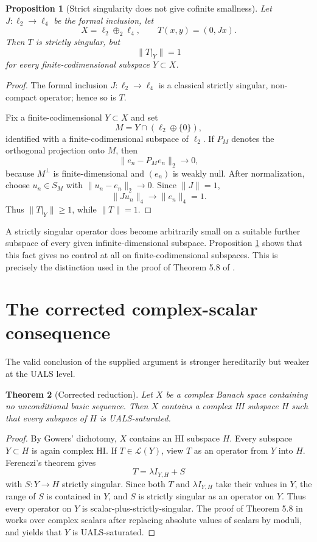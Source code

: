 \documentclass[11pt]{article}
\newtheorem{theorem}{Theorem}[section]
\newtheorem{proposition}[theorem]{Proposition}
\theoremstyle{definition}
\theoremstyle{remark}
\newcommand{\LL}{\mathcal{L}}
\begin{document}
\begin{proposition}[Strict singularity does not give cofinite smallness]\label{prop:J}
Let $J:\ell_2\to\ell_4$ be the formal inclusion, let
\[
  X=\ell_2\oplus_2\ell_4,
  \qquad
  T(x,y)=(0,Jx).
\]
Then $T$ is strictly singular, but
\[
  \|T|_Y\|=1
\]
for every finite-codimensional subspace $Y\subset X$.
\end{proposition}

\begin{proof}
The formal inclusion $J:\ell_2\to\ell_4$ is a classical strictly singular, non-compact operator; hence so is $T$.

Fix a finite-codimensional $Y\subset X$ and set
\[
  M=Y\cap(\ell_2\oplus\{0\}),
\]
identified with a finite-codimensional subspace of $\ell_2$.  If $P_M$ denotes the orthogonal projection onto $M$, then
\[
  \|e_n-P_Me_n\|_2\longrightarrow 0,
\]
because $M^\perp$ is finite-dimensional and $(e_n)$ is weakly null.  After normalization, choose $u_n\in S_M$ with $\|u_n-e_n\|_2\to0$.  Since $\|J\|=1$,
\[
  \|Ju_n\|_4\longrightarrow \|e_n\|_4=1.
\]
Thus $\|T|_Y\|\geq1$, while $\|T\|=1$.
\end{proof}

A strictly singular operator does become arbitrarily small on a suitable further subspace of every given infinite-dimensional subspace.  Proposition \ref{prop:J} shows that this fact gives no control at all on finite-codimensional subspaces.  This is precisely the distinction used in the proof of Theorem 5.8 of \cite{AGLM}.

\section{The corrected complex-scalar consequence}

The valid conclusion of the supplied argument is stronger hereditarily but weaker at the UALS level.

\begin{theorem}[Corrected reduction]\label{thm:corrected}
Let $X$ be a complex Banach space containing no unconditional basic sequence.  Then $X$ contains a complex HI subspace $H$ such that every subspace of $H$ is UALS-saturated.
\end{theorem}

\begin{proof}
By Gowers' dichotomy, $X$ contains an HI subspace $H$.  Every subspace $Y\subset H$ is again complex HI.  If $T\in\LL(Y)$, view $T$ as an operator from $Y$ into $H$.  Ferenczi's theorem gives
\[
  T=\lambda I_{Y,H}+S
\]
with $S:Y\to H$ strictly singular.  Since both $T$ and $\lambda I_{Y,H}$ take their values in $Y$, the range of $S$ is contained in $Y$, and $S$ is strictly singular as an operator on $Y$.  Thus every operator on $Y$ is scalar-plus-strictly-singular.  The proof of Theorem 5.8 in \cite{AGLM} works over complex scalars after replacing absolute values of scalars by moduli, and yields that $Y$ is UALS-saturated.
\end{proof}
\end{document}
